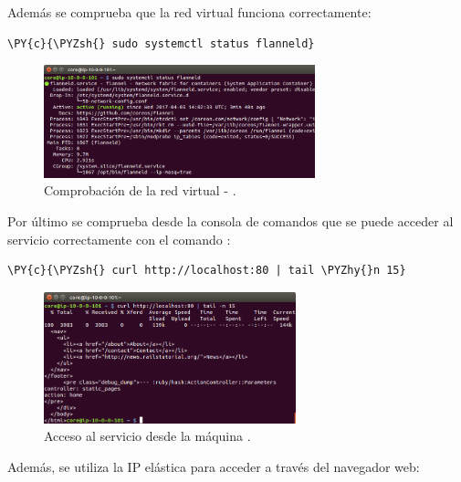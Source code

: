 Además se comprueba que la red virtual funciona correctamente:

\begin{framed_shaded}
\begin{Verbatim}[fontsize=\relsize{-2.5},fontseries=b,commandchars=\\\{\}]
\PY{c}{\PYZsh{} sudo systemctl status flanneld}
\end{Verbatim}
\end{framed_shaded}

\begin{figure}[H]
\centering
\includegraphics[width=0.7\textwidth]{images/figures/flanneld-aws-1.png}
\caption{Comprobación de la red virtual - .}
\end{figure}

Por último se comprueba desde la consola de comandos que se puede acceder al servicio correctamente con el comando :

\begin{framed_shaded}
\begin{Verbatim}[fontsize=\relsize{-2.5},fontseries=b,commandchars=\\\{\}]
\PY{c}{\PYZsh{} curl http://localhost:80 | tail \PYZhy{}n 15}
\end{Verbatim}
\end{framed_shaded}

\begin{figure}[H]
\centering
\includegraphics[width=0.65\textwidth]{images/figures/curl-aws-1.png}
\caption{Acceso al servicio desde la máquina .}
\end{figure}

Además, se utiliza la IP elástica para acceder a través del navegador web:

